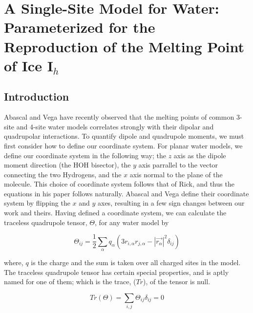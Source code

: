 

% 

\chapter{A Single-Site Model for Water: Parameterized for the Reproduction of the Melting Point of Ice I$_h$}

\newcommand{\degree}{\ensuremath{^\circ}}


\section{Introduction}
Abascal and Vega have recently observed that the melting points of common 
3-site and 4-site water models correlates strongly with their dipolar and 
quadrupolar interactions.\cite{Abascal2007b,Abascal2007c,Abascal2007d} To quantify
dipole and quadrupole moments, we must first consider how to define our
coordinate system. For planar
water models, we define our coordinate system in the following way;
the $z$ axis as the dipole moment direction (the HOH bisector), the $y$ axis
parrallel to the vector connecting the two Hydrogens, and the $x$ axis normal 
to the plane of the molecule. This choice of coordinate system follows that of
Rick, and thus the equations in his paper follows naturally. 
Abascal and Vega define their coordinate system by flipping the $x$ and $y$
axes, resulting in a few sign changes between our work and theirs. Having 
defined a coordinate system, we can calculate the traceless quadrupole tensor,
$\Theta$, for any water model by

\begin{equation}
\Theta_{ij} = \frac{1}{2} \sum_{\alpha}q_{\alpha}(3r_{i,\alpha}r_{j,\alpha}-|\vec{r_{\alpha}}|^{2}\delta_{ij})
\end{equation}

where, $q$ is the charge and the sum is taken over all charged sites in the 
model. The traceless quadrupole tensor has certain special properties, and
is aptly named for one of them; which is the trace, ($Tr$), of the tensor 
is null.

\begin{equation}
Tr(\Theta) = \sum_{i,j}\Theta_{ij}\delta_{ij} = 0
\end{equation}

